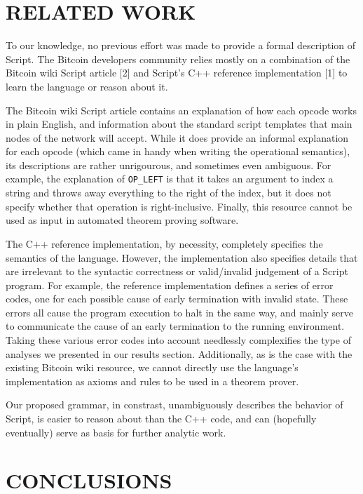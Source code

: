 \documentclass[letterpaper, 10 pt, conference]{ieeeconf}
\begin{document}
\section{RELATED WORK}

To our knowledge, no previous effort was made to provide a formal description of Script. The Bitcoin developers community relies mostly on a combination of the Bitcoin wiki Script article [2] and Script's C++ reference implementation [1] to learn the language or reason about it.

The Bitcoin wiki Script article contains an explanation of how each opcode works in plain English, and information about the standard script templates that main nodes of the network will accept. While it does provide an informal explanation for each opcode (which came in handy when writing the operational semantics), its descriptions are rather unrigourous, and sometimes even ambiguous. For example, the explanation of \texttt{OP\_LEFT} is that it takes an argument to index a string and throws away everything to the right of the index, but it does not specify whether that operation is right-inclusive. Finally, this resource cannot be used as input in automated theorem proving software. 

The C++ reference implementation, by necessity, completely specifies the semantics of the language. However, the implementation also specifies details that are irrelevant to the syntactic correctness or valid/invalid judgement of a Script program. For example, the reference implementation defines a series of error codes, one for each possible cause of early termination with invalid state. These errors all cause the program execution to halt in the same way, and mainly serve to communicate the cause of an early termination to the running environment. Taking these various error codes into account needlessly complexifies the type of analyses we presented in our results section. Additionally, as is the case with the existing Bitcoin wiki resource, we cannot directly use the language's implementation as axioms and rules to be used in a theorem prover.

Our proposed grammar, in constrast, unambiguously describes the behavior of Script, is easier to reason about than the C++ code, and can (hopefully eventually) serve as basis for further analytic work.


\section{CONCLUSIONS}
\end{document}
